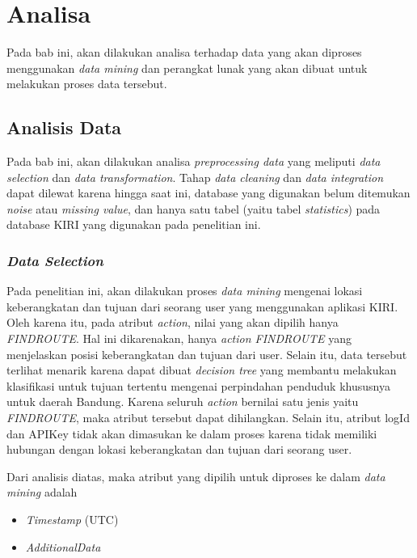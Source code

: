 \chapter{Analisa}

Pada bab ini, akan dilakukan analisa terhadap data yang akan diproses menggunakan \textsl{data mining} dan perangkat lunak yang akan dibuat untuk melakukan proses data tersebut.

\section{Analisis Data}
Pada bab ini, akan dilakukan analisa \textsl{preprocessing data} yang meliputi \textsl{data selection} dan \textsl{data transformation}. Tahap \textsl{data cleaning} dan \textsl{data integration} dapat dilewat karena hingga saat ini, database yang digunakan belum ditemukan \textsl{noise} atau \textsl{missing value}, dan hanya satu tabel (yaitu tabel \textsl{statistics}) pada database KIRI yang digunakan pada penelitian ini.

\subsection{\textsl{Data Selection}}
Pada penelitian ini, akan dilakukan proses \textsl{data mining} mengenai lokasi keberangkatan dan tujuan dari seorang user yang menggunakan aplikasi KIRI. Oleh karena itu, pada atribut \textsl{action}, nilai yang akan dipilih hanya \textsl{FINDROUTE}. Hal ini dikarenakan, hanya \textsl{action FINDROUTE} yang menjelaskan posisi keberangkatan dan tujuan dari user. Selain itu, data tersebut terlihat menarik karena dapat dibuat \textsl{decision tree} yang membantu melakukan klasifikasi untuk tujuan tertentu mengenai perpindahan penduduk khususnya untuk daerah Bandung. Karena seluruh \textsl{action} bernilai satu jenis yaitu \textsl{FINDROUTE}, maka atribut tersebut dapat dihilangkan. Selain itu, atribut logId dan APIKey tidak akan dimasukan ke dalam proses karena tidak memiliki hubungan dengan lokasi keberangkatan dan tujuan dari seorang user.

Dari analisis diatas, maka atribut yang dipilih untuk diproses ke dalam \textsl{data mining} adalah
\begin{itemize}
	\item \textsl{Timestamp} (UTC)
	\item \textsl{AdditionalData}
\end{itemize}

